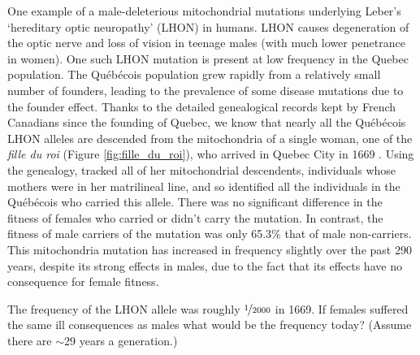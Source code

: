 {One example of a male-deleterious mitochondrial mutations underlying
Leber’s `hereditary optic neuropathy' (LHON) in humans. LHON causes degeneration
of the optic nerve and loss of vision in teenage males (with much
lower penetrance in women). One such LHON mutation is present at low
frequency in the Quebec population. The  Qu{\'e}b{\'e}cois population grew
rapidly from a relatively small number of founders, leading to the
prevalence of some disease mutations due to the founder effect. Thanks to the detailed
genealogical records kept by French Canadians since the founding of
Quebec, we know that nearly all the Qu{\'e}b{\'e}cois LHON alleles are
descended from the mitochondria of a single woman, one of the {\it
  fille du roi} (Figure \ref{fig:fille_du_roi}), who arrived in Quebec City
in 1669 \citep{laberge2005fille}.  Using the genealogy, \citet{milot2017mother} tracked all
of her mitochondrial descendents, individuals whose mothers were in her
matrilineal line, and so identified all the individuals in the
Qu{\'e}b{\'e}cois who carried this allele.
There was no significant difference in the fitness of females who
carried or didn't carry the mutation. In contrast, the fitness of male carriers of the mutation was only 65.3\% that of male non-carriers. 
This mitochondria mutation has increased in frequency slightly over the past 290
years, despite its strong effects in males, due to the fact that its effects have no consequence for female fitness.

\begin{question}{}
The frequency of the LHON allele was roughly $\nicefrac{1}{2000}$ in
1669. If females suffered the same ill consequences as males what
would be the frequency today? (Assume there are $\sim$29 years a generation.)
\end{question}


}
